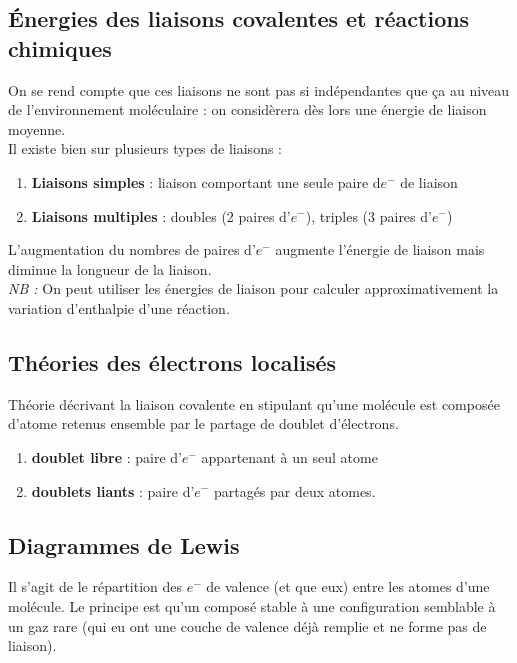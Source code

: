 \documentclass[12pt, a4paper]{article}
\begin{document}
\subsection{Énergies des liaisons covalentes et réactions chimiques}
On se rend compte que ces liaisons ne sont pas si indépendantes que ça au niveau de l'environnement moléculaire : on considèrera dès lors une énergie de liaison moyenne.\\
Il existe bien sur plusieurs types de liaisons : 
\begin{enumerate}
\item \textbf{Liaisons simples} : liaison comportant une seule paire d$e^-$ de liaison
\item \textbf{Liaisons multiples} : doubles (2 paires d'$e^-$), triples (3 paires d'$e^-$)
\end{enumerate}
L'augmentation du nombres de paires d'$e^-$ augmente l'énergie de liaison mais diminue la longueur de la liaison.\\
\textit{NB : } On peut utiliser les énergies de liaison pour calculer approximativement la variation d'enthalpie d'une réaction.

\subsection{Théories des électrons localisés}
Théorie décrivant la liaison covalente en stipulant qu'une molécule est composée d'atome retenus ensemble par le partage de doublet d'électrons. 
\begin{enumerate}
\item \textbf{doublet libre} : paire d'$e^-$ appartenant à un seul atome
\item \textbf{doublets liants} : paire d'$e^-$ partagés par deux atomes.
\end{enumerate}

\subsection{Diagrammes de Lewis}
Il s'agit de le répartition des $e^-$ de valence (et que eux) entre les atomes d'une molécule. Le principe est qu'un composé stable à une configuration semblable à un gaz rare (qui eu ont une couche de valence déjà remplie et ne forme pas de liaison).\\
\end{document}

